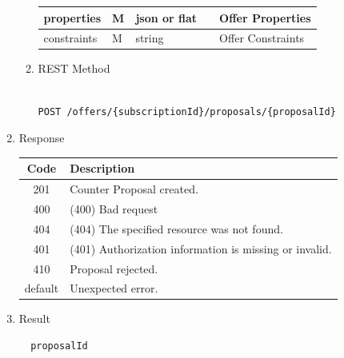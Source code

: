 \begin{enumerate}
\begin{enumerate}
\begin{table}[H]
\begin{center}
\begin{tabular}{|p{3cm}|l|p{3cm}|p{3cm}|p{4cm}|}
properties		& M &	json or flat 	&		& Offer Properties		\\
\hline

constraints 	& M &	string			&		& Offer Constraints		\\
\hline

\end{tabular}
\end{center}

\end{table}

\item REST Method

\begin{tcolorbox}[boxrule=0pt, frame empty]
\begin{verbatim} 

POST /offers/{subscriptionId}/proposals/{proposalId}

\end{verbatim}
\end{tcolorbox}

\end{enumerate}

\item Response

\begin{table}[H]
\footnotesize

\begin{center}
\begin{tabular}{|c|l|} 
\hline
\rowcolor{lightgray}	Code 		& 	Description \\
\hline
201	 		&	Counter Proposal created.  \\
\hline
400			&	(400) Bad request	\\
\hline
404			&	(404) The specified resource was not found. \\
\hline
401			&	(401) Authorization information is missing or invalid. \\
\hline
410			&	Proposal rejected. \\
\hline
default		&	Unexpected error. \\
\hline
\end{tabular}
\end{center}

\end{table}

\item Result

\begin{tcolorbox}[boxrule=0pt, frame empty]
\begin{verbatim}
  proposalId
\end{verbatim}
\end{tcolorbox}


\end{enumerate}
